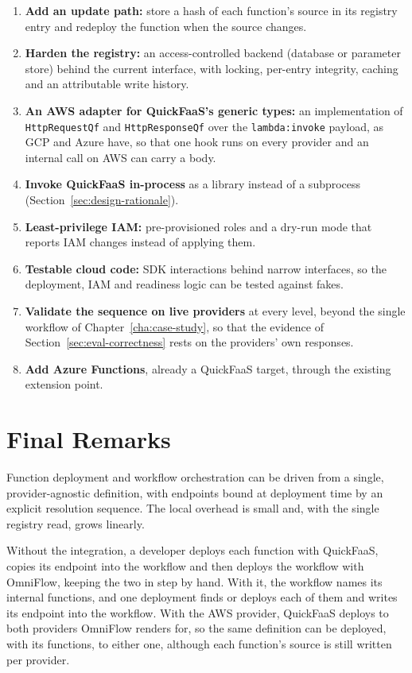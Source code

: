 \begin{enumerate}
  \item \textbf{Add an update path:} store a hash of each function's source in its registry entry
  and redeploy the function when the source changes.
  \item \textbf{Harden the registry:} an access-controlled backend (database or parameter store)
  behind the current interface, with locking, per-entry integrity, caching and an attributable
  write history.
  \item \textbf{An AWS adapter for QuickFaaS's generic types:} an implementation of
  \texttt{HttpRequestQf} and \texttt{HttpResponseQf} over the \texttt{lambda:invoke} payload, as
  GCP and Azure have, so that one hook runs on every provider and an internal call on AWS can carry
  a body.
  \item \textbf{Invoke QuickFaaS in-process} as a library instead of a subprocess
  (Section~\ref{sec:design-rationale}).
  \item \textbf{Least-privilege IAM:} pre-provisioned roles and a dry-run mode that reports IAM
  changes instead of applying them.
  \item \textbf{Testable cloud code:} SDK interactions behind narrow interfaces, so the deployment,
  IAM and readiness logic can be tested against fakes.
  \item \textbf{Validate the sequence on live providers} at every level, beyond the single workflow of
  Chapter~\ref{cha:case-study}, so that the evidence of Section~\ref{sec:eval-correctness} rests on
  the providers' own responses.
  \item \textbf{Add Azure Functions}, already a QuickFaaS target, through the existing extension
  point.
\end{enumerate}

\section{Final Remarks}
\label{sec:concl-final}

Function deployment and workflow orchestration can be driven from a single, provider-agnostic
definition, with endpoints bound at deployment time by an explicit resolution sequence. The local
overhead is small and, with the single registry read, grows linearly.

Without the integration, a developer deploys each function with QuickFaaS, copies its endpoint into
the workflow and then deploys the workflow with OmniFlow, keeping the two in step by hand. With it,
the workflow names its internal functions, and one deployment finds or deploys each of them and
writes its endpoint into the workflow. With the AWS provider, QuickFaaS deploys to both providers
OmniFlow renders for, so the same definition can be deployed, with its functions, to either one,
although each function's source is still written per provider.

